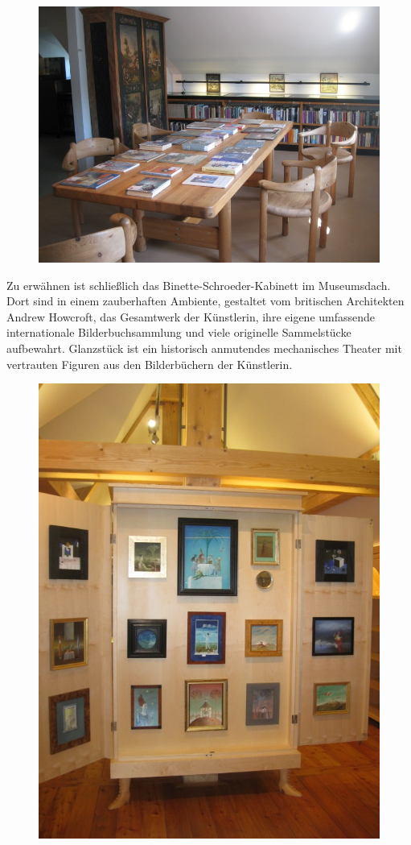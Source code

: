 \documentclass[a4paper,
fontsize=11pt,
oneside,
numbers=noperiodatend,
parskip=half-,
bibliography=totoc,
final
]{scrartcl}
\begin{document}
\begin{figure}[htbp]
\centering
\includegraphics{img/bild25.jpg}
\end{figure}

Zu erwähnen ist schließlich das Binette-Schroeder-Kabinett im
Museumsdach. Dort sind in einem zauberhaften Ambiente, gestaltet vom
britischen Architekten Andrew Howcroft, das Gesamtwerk der Künstlerin,
ihre eigene umfassende internationale Bilderbuchsammlung und viele
originelle Sammelstücke aufbewahrt. Glanzstück ist ein historisch
anmutendes mechanisches Theater mit vertrauten Figuren aus den
Bilderbüchern der Künstlerin.

\begin{figure}[htbp]
\centering
\includegraphics{img/bild26.jpg}
\end{figure}
\end{document}
